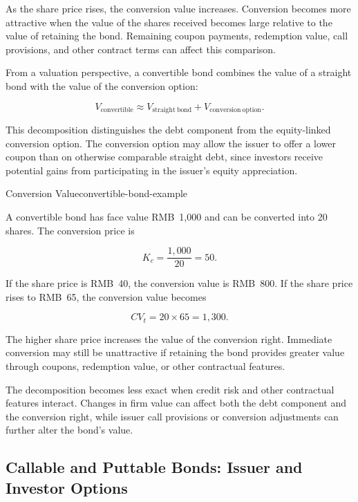 As the share price rises, the conversion value increases. Conversion becomes more attractive when the value of the shares received becomes large relative to the value of retaining the bond. Remaining coupon payments, redemption value, call provisions, and other contract terms can affect this comparison.

From a valuation perspective, a convertible bond combines
the value of a straight bond with the value of the
conversion option:

\begin{equation}
V_{\mathrm{convertible}}
\approx
V_{\mathrm{straight\ bond}}
+
V_{\mathrm{conversion\ option}}.
\label{eq:ch18-convertible-decomposition}
\end{equation}

This decomposition distinguishes the debt component from
the equity-linked conversion option. The conversion
option may allow the issuer to offer a lower coupon than
on otherwise comparable straight debt, since investors
receive potential gains from participating in the
issuer's equity appreciation.

\begin{example}{Conversion Value}{convertible-bond-example}

A convertible bond has face value RMB~1,000 and can be converted into 20 shares. The conversion price is

$$
K_c=\frac{1{,}000}{20}=50.
$$

If the share price is RMB~40, the conversion value is RMB~800. If the share price rises to RMB~65, the conversion value becomes

$$
CV_t=20\times 65=1{,}300.
$$

The higher share price increases the value of the conversion right. Immediate conversion may still be unattractive if retaining the bond provides greater value through coupons, redemption value, or other contractual features.

\end{example}

The decomposition becomes less exact when credit risk and other contractual features interact. Changes in firm value can affect both the debt component and the conversion right, while issuer call provisions or conversion adjustments can further alter the bond's value.

\subsection[Callable and Puttable Bonds: Issuer and Investor Options]{Callable and Puttable Bonds: Issuer and Investor Options}


